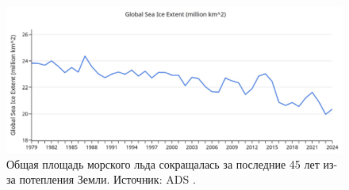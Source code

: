 \documentclass[10pt,twocolumn,letterpaper]{article}
\begin{document}
\begin{figure}[t]
\begin{center}
\includegraphics[width=1\textwidth]{ice.jpg}
\end{center}
   \caption{Общая площадь морского льда сокращалась за последние 45 лет из-за потепления Земли. Источник: ADS \cite{149}.}
\label{fig:24}
\end{figure}

\clearpage
\twocolumn

{\small


}
\end{document}
